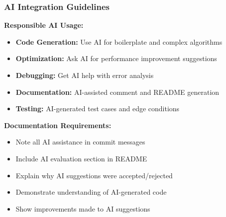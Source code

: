 \documentclass{beamer}
\begin{document}
\begin{frame}
\frametitle{AI Integration Guidelines}
\small \textbf{Responsible AI Usage:}
\begin{itemize}
    \item \footnotesize \textbf{Code Generation:} Use AI for boilerplate and complex algorithms
    \item \footnotesize \textbf{Optimization:} Ask AI for performance improvement suggestions
    \item \footnotesize \textbf{Debugging:} Get AI help with error analysis
    \item \footnotesize \textbf{Documentation:} AI-assisted comment and README generation
    \item \footnotesize \textbf{Testing:} AI-generated test cases and edge conditions
\end{itemize}

\vspace{0.3cm}
\small \textbf{Documentation Requirements:}
\begin{itemize}
    \item \footnotesize Note all AI assistance in commit messages
    \item \footnotesize Include AI evaluation section in README
    \item \footnotesize Explain why AI suggestions were accepted/rejected
    \item \footnotesize Demonstrate understanding of AI-generated code
    \item \footnotesize Show improvements made to AI suggestions
\end{itemize}
\end{frame}
\end{document}
